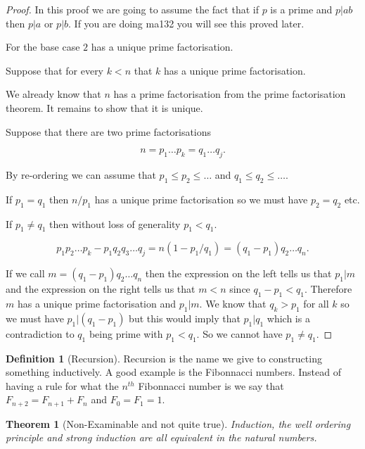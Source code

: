 \documentclass[
]{book}
\newtheorem{theorem}{Theorem}[chapter]
\theoremstyle{definition}
\newtheorem{definition}{Definition}[chapter]
\theoremstyle{definition}
\theoremstyle{definition}
\theoremstyle{definition}
\theoremstyle{remark}
\begin{document}
\begin{proof}
In this proof we are going to assume the fact that if \(p\) is a prime and \(p|ab\) then \(p|a\) or \(p|b\). If you are doing ma132 you will see this proved later.

For the base case \(2\) has a unique prime factorisation.

Suppose that for every \(k < n\) that \(k\) has a unique prime factorisation.

We already know that \(n\) has a prime factorisation from the prime factorisation theorem. It remains to show that it is unique.

Suppose that there are two prime factorisations

\[ n=p_1\dots p_k = q_1 \dots q_j.  \]

By re-ordering we can assume that \(p_1 \leq p_2 \leq \dots\) and \(q_1 \leq q_2 \leq \dots\).

If \(p_1=q_1\) then \(n/p_1\) has a unique prime factorisation so we must have \(p_2=q_2\) etc.

If \(p_1 \neq q_1\) then without loss of generality \(p_1 < q_1\).

\[ p_1p_2 \dots p_k - p_1 q_2 q_3 \dots q_j = n (1-p_1/q_1) = (q_1-p_1)q_2\dots q_n.\]

If we call \(m = (q_1-p_1)q_2 \dots q_n\) then the expression on the left tells us that \(p_1|m\) and the expression on the right tells us that \(m < n\) since \(q_1-p_1 < q_1\). Therefore \(m\) has a unique prime factorisation and \(p_1|m\). We know that \(q_k > p_1\) for all \(k\) so we must have \(p_1|(q_1-p_1)\) but this would imply that \(p_1|q_1\) which is a contradiction to \(q_1\) being prime with \(p_1<q_1\). So we cannot have \(p_1 \neq q_1\).
\end{proof}

\begin{definition}[Recursion]
Recursion is the name we give to constructing something inductively. A good example is the Fibonnacci numbers. Instead of having a rule for what the \(n^{th}\) Fibonnacci number is we say that \(F_{n+2} = F_{n+1} + F_{n}\) and \(F_0 = F_1 =1\).
\end{definition}

\begin{theorem}[Non-Examinable and not quite true]
Induction, the well ordering principle and strong induction are all equivalent in the natural numbers.
\end{theorem}
\end{document}
